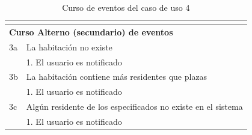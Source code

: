 \begin{table}[h!]
{\begin{tabular}{|l|l|l|l|}
        \hline
        \multicolumn{4}{l}{}                                                                                                                                                                                                                                                                                                  \\ 
        \hline
        \multicolumn{4}{|l|}{{\cellcolor[rgb]{0.886,0.886,0.886}}\textbf{Curso Alterno (secundario) de eventos}}                                                                                                                                                                                                              \\ 
        \hline
        3a & \multicolumn{3}{l|}{La habitación no existe}                                                                                                                                                                                                                                                                     \\ 
        \hline
        & \multicolumn{3}{l|}{1. El usuario es notificado}                                                                                                                                                                                                                                                                 \\ 
        \hline
        3b & \multicolumn{3}{l|}{La habitación contiene más residentes que plazas}                                                                                                                                                                                                                                            \\ 
        \hline
        & \multicolumn{3}{l|}{1. El usuario es notificado}                                                                                                                                                                                                                                                                 \\ 
        \hline
        3c & \multicolumn{3}{l|}{Algún residente de los especificados no existe en el sistema}                                                                                                                                                                                                                                \\ 
        \hline
        & \multicolumn{3}{l|}{1. El usuario es notificado}                                                                                                                                                                                                                                                                 \\ 
        \hline
        \end{tabular}
    }
    \caption{Curso de eventos del caso de uso 4}
\end{table}

